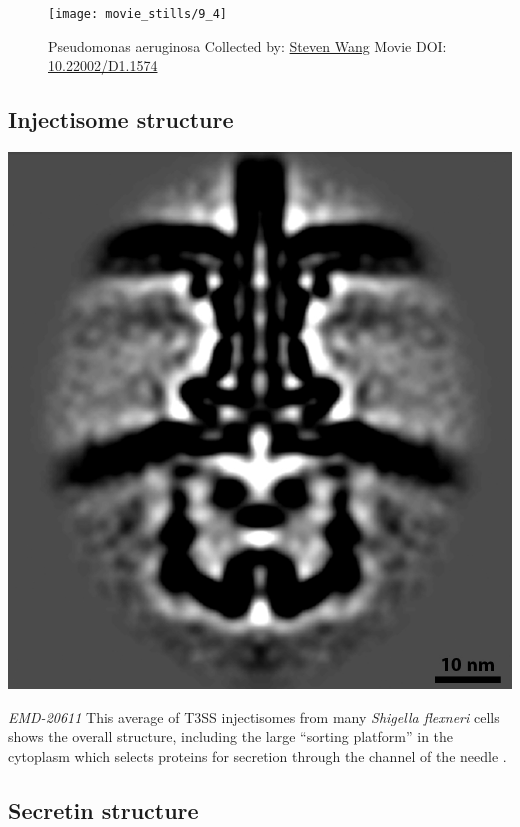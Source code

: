 \documentclass[]{tufte-book}
\begin{document}
\begin{figure}
\texttt{[image: movie\_stills/9\_4]} \caption[Pseudomonas aeruginosa Collected by:
\protect\hyperlink{steven_wang}{Steven Wang} Movie DOI:
\href{https://doi.org/10.22002/D1.1574}{10.22002/D1.1574}]{Pseudomonas aeruginosa Collected by:
\protect\hyperlink{steven_wang}{Steven Wang} Movie DOI:
\href{https://doi.org/10.22002/D1.1574}{10.22002/D1.1574}}\label{fig:9-4}
\end{figure}

\subsection{Injectisome structure}\label{Injectisome_structure}

\includegraphics{img/schematics/9_4_1}

\emph{EMD-20611} This average of T3SS injectisomes from many
\emph{Shigella flexneri} cells shows the overall structure, including
the large ``sorting platform'' in the cytoplasm which selects proteins
for secretion through the channel of the needle \citep{tachiyama2019}.

\subsection{Secretin structure}\label{Secretin_structure}
\end{document}
